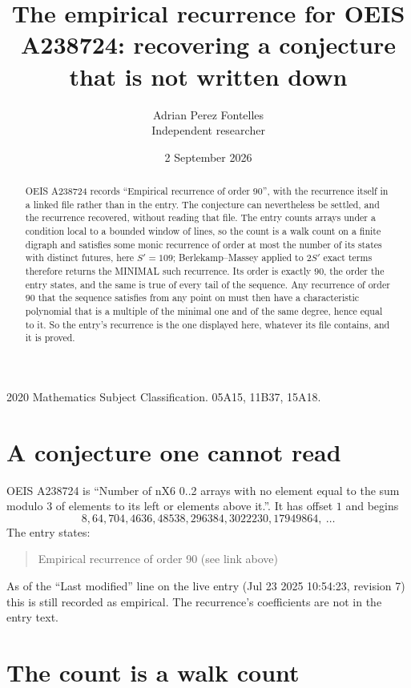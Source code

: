 \documentclass[11pt,a4paper]{article}
\title{The empirical recurrence for OEIS A238724: recovering a conjecture that is not written down}
\author{Adrian Perez Fontelles\\ \small Independent researcher}
\date{2 September 2026}
\theoremstyle{plain}
\theoremstyle{definition}
\begin{document}
\maketitle

\begin{abstract}
OEIS A238724 records ``Empirical recurrence of order $90$'', with the recurrence itself in a
linked file rather than in the entry. The conjecture can nevertheless be settled, and the
recurrence recovered, without reading that file. The entry counts arrays under a condition
local to a bounded window of lines, so the count is a walk count on a finite digraph and
satisfies some monic recurrence of order at most the number of its states with distinct
futures, here $S'=109$; Berlekamp--Massey applied to $2S'$ exact
terms therefore returns the MINIMAL such recurrence. Its order is exactly $90$, the order
the entry states, and the same is true of every tail of the sequence. Any recurrence of order
$90$ that the sequence satisfies from any point on must then have a characteristic
polynomial that is a multiple of the minimal one and of the same degree, hence equal to it. So
the entry's recurrence is the one displayed here, whatever its file contains, and it is
proved.
\end{abstract}

\noindent\small 2020 Mathematics Subject Classification. 05A15, 11B37, 15A18.\normalsize

\section{A conjecture one cannot read}

OEIS A238724 is ``Number of nX6 0..2 arrays with no element equal to the sum modulo 3 of elements to its left or elements above it.''. It has offset $1$ and begins
\[
8, 64, 704, 4636, 48538, 296384, 3022230, 17949864,\ \dots
\]
The entry states:
\begin{quote}
Empirical recurrence of order 90 (see link above)
\end{quote}
As of the ``Last modified'' line on the live entry (Jul 23 2025 10:54:23, revision 7) this is still
recorded as empirical. The recurrence's coefficients are not in the entry text.

\section{The count is a walk count}
\end{document}
